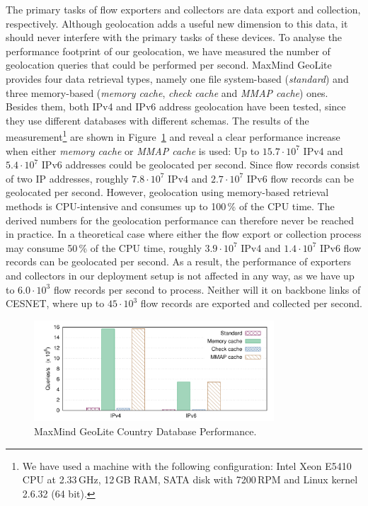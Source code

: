 The primary tasks of flow exporters and collectors are data export and collection, respectively. Although geolocation adds a useful new dimension to this data, it should never interfere with the primary tasks of these devices. To analyse the performance footprint of our geolocation, we have measured the number of geolocation queries that could be performed per second. MaxMind GeoLite provides four data retrieval types, namely one file system-based (\textit{standard}) and three memory-based (\textit{memory cache}, \textit{check cache} and \textit{MMAP cache}) ones. Besides them, both IPv4 and IPv6 address geolocation have been tested, since they use different databases with different schemas. The results of the measurement\footnote{We have used a machine with the following configuration: Intel Xeon E5410 CPU at 2.33\,GHz, 12\,GB RAM, SATA disk with 7200\,RPM and Linux kernel 2.6.32 (64 bit).} are shown in Figure~\ref{fig:geo-mm-perf} and reveal a clear performance increase when either \textit{memory cache} or \textit{MMAP cache} is used: Up to $15.7 \cdot 10^7$ IPv4 and $5.4 \cdot 10^7$ IPv6 addresses could be geolocated per second. Since flow records consist of two IP addresses, roughly $7.8 \cdot 10^7$ IPv4 and $2.7 \cdot 10^7$ IPv6 flow records can be geolocated per second. However, geolocation using memory-based retrieval methods is CPU-intensive and consumes up to 100\,\% of the CPU time. The derived numbers for the geolocation performance can therefore never be reached in practice. In a theoretical case where either the flow export or collection process may consume 50\,\% of the CPU time, roughly $3.9 \cdot 10^7$ IPv4 and $1.4 \cdot 10^7$ IPv6 flow records can be geolocated per second. As a result, the performance of exporters and collectors in our deployment setup is not affected in any way, as we have up to $6.0 \cdot 10^3$ flow records per second to process. Neither will it on backbone links of CESNET, where up to $45 \cdot 10^3$ flow records are exported and collected per second.

\begin{figure}[!tb]
    \centering
    \includegraphics[width=0.8\textwidth]{figures/paper-geolocation/performance/performance}
    \caption{MaxMind GeoLite Country Database Performance.}
    \label{fig:geo-mm-perf}
\end{figure}


